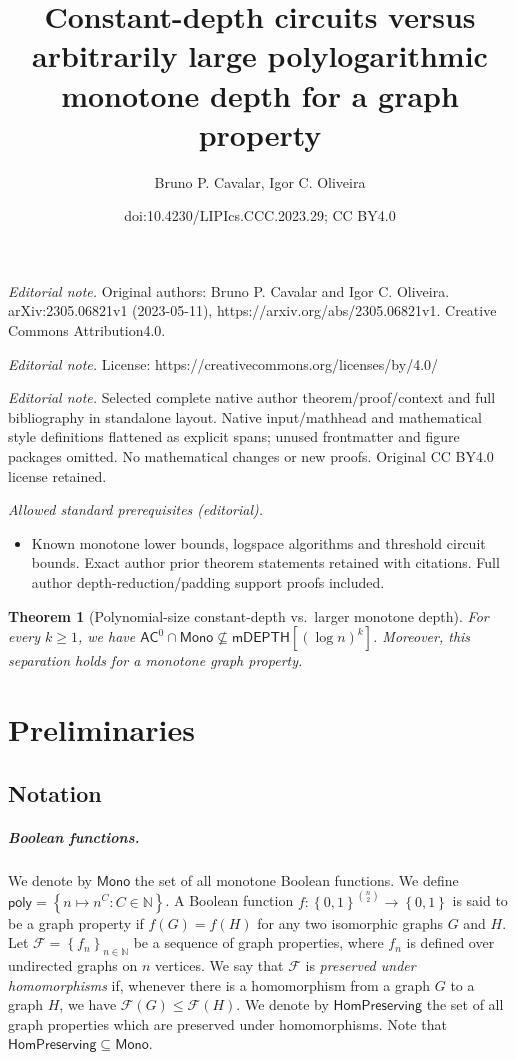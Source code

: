 \documentclass[10pt,a4paper]{article}
\title{Constant-depth circuits versus arbitrarily large polylogarithmic monotone depth for a graph property}
\author{Bruno P. Cavalar, Igor C. Oliveira}
\date{doi:10.4230/LIPIcs.CCC.2023.29; CC BY4.0}
\newtheorem{theorem}{Theorem}[section]
\newcommand{\poly}{\mathsf{poly}}
\newcommand{\complexityfont}[1]{\mathsf{#1}}
\newcommand{\monclass}[1]{\mathsf{m}#1}
\def\AC           {\complexityfont{AC}}
\def\DEPTH        {\complexityfont{DEPTH}}
\def\mDEPTH       {\monclass{\DEPTH}}
\newcommand{\semMon}[1]{#1 \cap \monfns}
\newcommand{\monfns}{\mathsf{Mono}}
\newcommand{\HomPres}{\mathsf{HomPreserving}}
\def\sseq{\subseteq}
\newcommand{\set}[1]{\left\{#1\right\}}
\newcommand{\blt}{\set{0,1}}
\def\bbn{{\mathbb N}}
\def\calf{{\mathcal F}}
\begin{document}
\maketitle
\setcounter{section}{2}
\noindent\textit{Editorial note.} Original authors: Bruno P. Cavalar and Igor C. Oliveira. arXiv:2305.06821v1 (2023-05-11), https://arxiv.org/abs/2305.06821v1. Creative Commons Attribution4.0.\par\medskip
\noindent\textit{Editorial note.} License: https://creativecommons.org/licenses/by/4.0/\par\medskip
\noindent\textit{Editorial note.} Selected complete native author theorem/proof/context and full bibliography in standalone layout. Native input/mathhead and mathematical style definitions flattened as explicit spans; unused frontmatter and figure packages omitted. No mathematical changes or new proofs. Original CC BY4.0 license retained.\par\medskip
\noindent\textit{Allowed standard prerequisites (editorial).}\begin{itemize}
\item Known monotone lower bounds, logspace algorithms and threshold circuit bounds. Exact author prior theorem statements retained with citations. Full author depth-reduction/padding support proofs included.
\end{itemize}\medskip
\begin{theorem}[Polynomial-size constant-depth vs.~larger monotone depth]
    \label{thm:ac0-fml-graph-intro}
    For every $k \geq 1$,
    we have
    $\semMon{\AC^0} \not\sseq \mDEPTH[(\log n)^k]$. Moreover, this separation holds for a monotone graph property.
\end{theorem}

\section{Preliminaries}

\subsection{Notation}

\subparagraph{Boolean functions.}

We denote by $\monfns$ the set of all monotone Boolean functions.
We define $\poly = \set{n \mapsto n^C : C \in \bbn}$.
A Boolean function
    $f : \blt^{\binom{n}{2}} \to \blt$ is said to be a graph property
    if $f(G) = f(H)$ for any two isomorphic graphs $G$ and $H$.
Let $\calf = \set{f_n}_{n \in \bbn}$
    be a sequence of graph properties, where $f_n$ is defined over undirected graphs on
    $n$ vertices.
    We say that $\calf$ is
    \emph{preserved under homomorphisms} if,
    whenever there is a homomorphism from a graph $G$ to a graph $H$,
    we have $\calf(G) \leq \calf(H)$.
    We denote by $\HomPres$ 
    the set of all 
    graph properties which are preserved under homomorphisms.
    Note that $\HomPres \sseq \monfns$.
\end{document}
